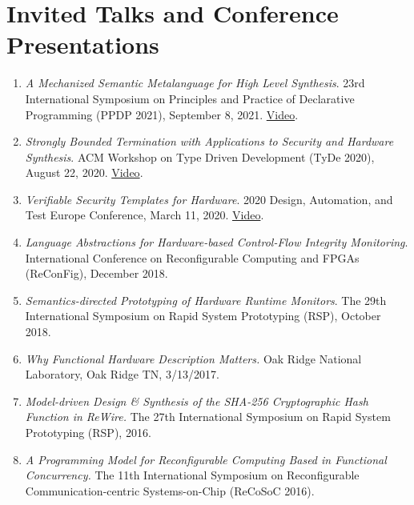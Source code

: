 \documentclass[12pt]{article} %
\begin{document}


\section*{Invited Talks and Conference Presentations}

\begin{enumerate}[leftmargin=0mm]

\item{\it A Mechanized Semantic Metalanguage for High Level Synthesis}. 23rd International Symposium on Principles and Practice of Declarative Programming (PPDP 2021), September 8, 2021. \href{https://www.youtube.com/watch?v=fZYWlE5XR_Y}{Video}.

\item{\it Strongly Bounded Termination with Applications to Security and Hardware Synthesis}. ACM Workshop on Type Driven Development (TyDe 2020), August 22, 2020. \href{https://www.youtube.com/watch?v=IQ2Xp4mWBIk}{Video}.

\item{\it Verifiable Security Templates for Hardware}. 2020 Design, Automation, and Test Europe Conference, March 11, 2020. \href{https://www.youtube.com/watch?v=EOCoqE7PZNs}{Video}.

\item{\it Language Abstractions for Hardware-based Control-Flow Integrity Monitoring}.  International Conference on Reconfigurable Computing and FPGAs (ReConFig), December 2018.

\item{\it Semantics-directed Prototyping of Hardware Runtime Monitors}. The 29th International Symposium on Rapid System Prototyping (RSP), October 2018.

\item{\it Why Functional Hardware Description Matters.}
Oak Ridge National Laboratory, Oak Ridge TN, 3/13/2017.


\item{\it Model-driven Design \& Synthesis of the SHA-256 Cryptographic Hash Function in ReWire.} The 27th International Symposium on Rapid System Prototyping (RSP), 2016.

\item{\it A Programming Model for Reconfigurable Computing Based in Functional Concurrency.} The 11th International Symposium on Reconfigurable Communication-centric Systems-on-Chip (ReCoSoC 2016).


\end{enumerate}
\end{document}
